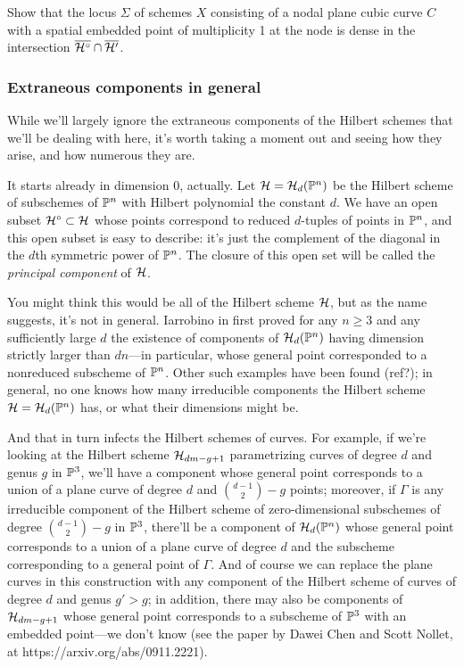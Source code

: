 \begin{exercise}
Show that the locus $\Sigma$ of schemes $X$ consisting of a nodal plane cubic curve $C$ with a spatial embedded point of multiplicity 1 at the node is dense in the intersection $\overline{{\cal H}^\circ} \cap \overline{{\cal H}'}$.
\end{exercise}

\subsubsection{Extraneous components in general}

While we'll largely ignore the extraneous components of the Hilbert schemes that we'll be dealing with here, it's worth taking a moment out and seeing how they arise, and how numerous they are.

It starts already in dimension 0, actually. Let ${\cal H} = {\cal H}_d({\mathbb P}^n)$ be the Hilbert scheme of subschemes of ${\mathbb P}^n$ with Hilbert polynomial the constant $d$. We have an open subset ${\cal H}^\circ \subset {\cal H}$ whose points correspond to reduced $d$-tuples of points in ${\mathbb P}^n$, and this open subset is easy to describe: it's just the complement of the diagonal in the $d$th symmetric power of ${\mathbb P}^n$. The closure of this open set will be called the \emph{principal component} of ${\cal H}$.

You might think this would be all of the Hilbert scheme ${\cal H}$, but as the name suggests, it's not in general. Iarrobino in \cite{Iarrobino} first proved  for any $n \geq 3$ and any sufficiently large $d$ the existence of components of ${\cal H}_d({\mathbb P}^n)$ having dimension strictly larger than $dn$---in particular, whose general point corresponded to a nonreduced subscheme of ${\mathbb P}^n$. Other such examples have been found (ref?); in general, no one knows how many irreducible components the Hilbert scheme ${\cal H} = {\cal H}_d({\mathbb P}^n)$ has, or what their dimensions might be.

And that in turn infects the Hilbert schemes of curves. For example, if we're looking at the Hilbert scheme ${\cal H}_{dm-g+1}$ parametrizing curves of degree $d$ and genus $g$ in ${\mathbb P}^3$, we'll have a component whose general point corresponds to a union of a plane curve of degree $d$ and $\binom{d-1}{2} - g$ points; moreover, if $\Gamma$ is any irreducible component of the Hilbert scheme of zero-dimensional subschemes of degree $\binom{d-1}{2} - g$ in ${\mathbb P}^3$, there'll be a component of ${\cal H}_d({\mathbb P}^n)$ whose  general point corresponds to a union of a plane curve of degree $d$ and the subscheme corresponding to a general point of $\Gamma$. And of course we can replace the plane curves in this construction with any component of the Hilbert scheme of curves of degree $d$ and genus $g' > g$; in addition, there may also be components of ${\cal H}_{dm-g+1}$ whose general point corresponds to a subscheme of ${\mathbb P}^3$ with an embedded point---we don't know (see the paper by Dawei Chen and Scott Nollet, at https://arxiv.org/abs/0911.2221).

